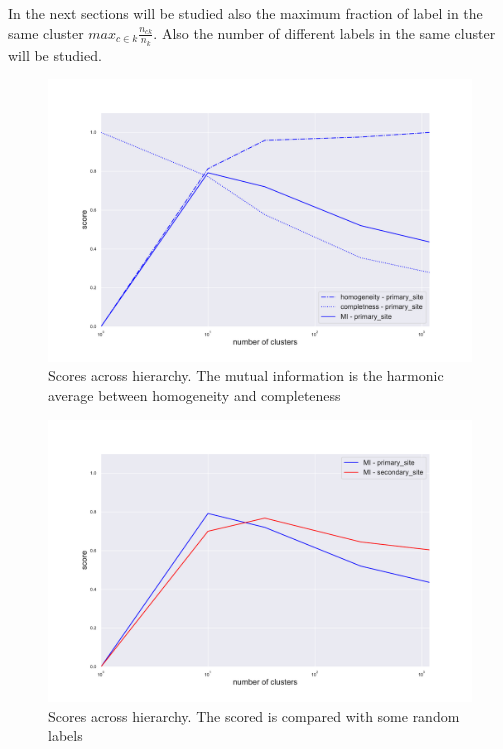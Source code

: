 In the next sections will be studied also the maximum fraction of label in the same cluster \(max_{c\in k}\frac{n_{c k}}{n_k}\).
Also the number of different labels in the same cluster will be studied.

\begin{figure}[htb!]
    \centering
    \includegraphics[width=0.9\linewidth]{pictures/topic/gtex/oversigma_10tissue/metric_scores_primarysite.pdf}
    \caption{Scores across hierarchy. The mutual information is the harmonic average between homogeneity and completeness}
    \label{fig:topic/metric_scores_primarysite}
\end{figure}

\begin{figure}[htb!]
    \centering
    \includegraphics[width=0.9\linewidth]{pictures/topic/gtex/oversigma_10tissue/metric_scores.pdf}
    \caption{Scores across hierarchy. The scored is compared with some random labels}
    \label{fig:topic/metric_scores}
\end{figure}